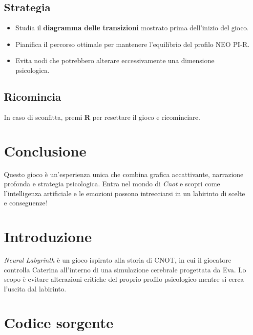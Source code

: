 \documentclass[a4paper,10pt]{article}
\begin{document}
\subsection*{Strategia}
\begin{itemize}
    \item Studia il \textbf{diagramma delle transizioni} mostrato prima dell'inizio del gioco.
    \item Pianifica il percorso ottimale per mantenere l'equilibrio del profilo NEO PI-R.
    \item Evita nodi che potrebbero alterare eccessivamente una dimensione psicologica.
\end{itemize}

\subsection*{Ricomincia}
In caso di sconfitta, premi \textbf{R} per resettare il gioco e ricominciare.

\section*{Conclusione}
Questo gioco è un'esperienza unica che combina grafica accattivante, narrazione profonda e strategia psicologica. Entra nel mondo di \emph{Cnot} e scopri come l'intelligenza artificiale e le emozioni possono intrecciarsi in un labirinto di scelte e conseguenze!


\section{Introduzione}
\textit{Neural Labyrinth} è un gioco ispirato alla storia di CNOT, in cui il giocatore controlla Caterina all'interno di una simulazione cerebrale progettata da Eva. Lo scopo è evitare alterazioni critiche del proprio profilo psicologico mentre si cerca l'uscita dal labirinto.

\newpage
\section{Codice sorgente}
\begin{multicols}{2}


\end{multicols}
\end{document}
